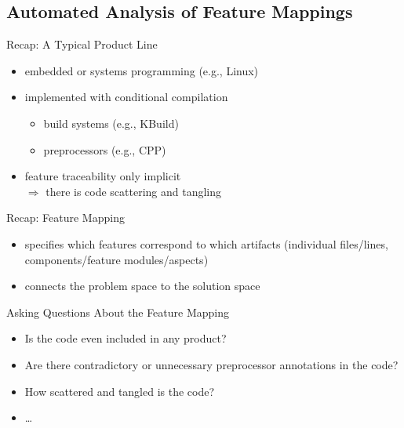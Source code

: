 
\newcommand{\notleftright}{\mathrel{\ooalign{$\Leftrightarrow$\cr\hidewidth$/$\hidewidth}}}

\subsection{Automated Analysis of Feature Mappings}

\begin{frame}{\myframetitle}
	\begin{fancycolumns}[widths={46,54}]
		\begin{note}{Recap: A Typical Product Line}
			\begin{itemize}
				\item embedded or systems programming (e.g., Linux)
				\item implemented with conditional compilation
				\begin{itemize}
					\item build systems (e.g., KBuild)
					\item preprocessors (e.g., CPP)
				\end{itemize}
				\item feature traceability only implicit\\
					$\Rightarrow$ there is code scattering and tangling
			\end{itemize}
		\end{note}
		\begin{definition}{Recap: Feature Mapping}
			\begin{itemize}
				\item specifies which features correspond to which artifacts (individual files/lines, components/feature modules/aspects)
				\item connects the problem space to the solution space
			\end{itemize}
		\end{definition}
		\nextcolumn
		\begin{example}{Asking Questions About the Feature Mapping}
			\begin{itemize}
				\item Is the code even included in any product?
				\item Are there contradictory or unnecessary preprocessor annotations in the code?
				\item How scattered and tangled is the code?
				\item \ldots
			\end{itemize}
		\end{example}
	\end{fancycolumns}
\end{frame}


